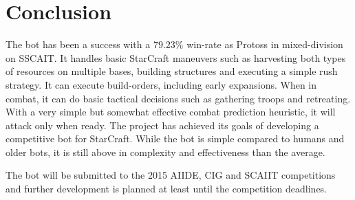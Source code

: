 \chapter{Conclusion}
The bot has been a success with a $79.23\%$ win-rate as Protoss in mixed-division on SSCAIT. It handles basic StarCraft maneuvers such as harvesting both types of resources on multiple bases, building structures and executing a simple rush strategy. It can execute build-orders, including early expansions. When in combat, it can do basic tactical decisions such as gathering troops and retreating. With a very simple but somewhat effective combat prediction heuristic, it will attack only when ready. The project has achieved its goals of developing a competitive bot for StarCraft. While the bot is simple compared to humans and older bots, it is still above in complexity and effectiveness than the average.

The bot will be submitted to the 2015 AIIDE, CIG and SCAIIT competitions and further development is planned at least until the competition deadlines.

